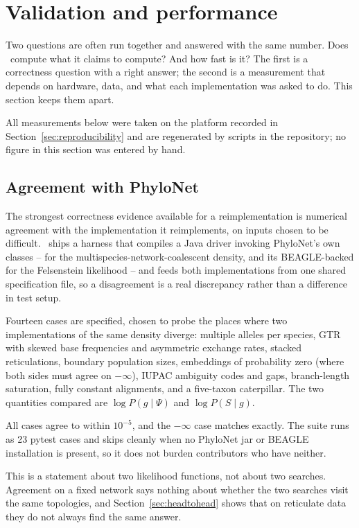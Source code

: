 \section{Validation and performance}
\label{sec:validation}

Two questions are often run together and answered with the same number. Does
\phynetpy\ compute what it claims to compute? And how fast is it? The first is
a correctness question with a right answer; the second is a measurement that
depends on hardware, data, and what each implementation was asked to do. This
section keeps them apart.

All measurements below were taken on the platform recorded in
Section~\ref{sec:reproducibility} and are regenerated by scripts in the
repository; no figure in this section was entered by hand.

\subsection{Agreement with PhyloNet}

The strongest correctness evidence available for a reimplementation is
numerical agreement with the implementation it reimplements, on inputs chosen
to be difficult. \phynetpy\ ships a harness that compiles a Java driver
invoking PhyloNet's own classes --  for
the multispecies-network-coalescent density, and its BEAGLE-backed
\cite{Ayres2012BEAGLE}  for the Felsenstein likelihood --
and feeds both implementations from one shared specification file, so a
disagreement is a real discrepancy rather than a difference in test setup.

Fourteen cases are specified, chosen to probe the places where two
implementations of the same density diverge: multiple alleles per species, GTR
with skewed base frequencies and asymmetric exchange rates, stacked
reticulations, boundary population sizes, embeddings of probability zero (where
both sides must agree on $-\infty$), IUPAC ambiguity codes and gaps,
branch-length saturation, fully constant alignments, and a five-taxon
caterpillar. The two quantities compared are
$\log P(g \mid \Psi)$ and $\log P(S \mid g)$.

All cases agree to within $10^{-5}$, and the $-\infty$ case matches exactly. The
suite runs as 23 pytest cases and skips cleanly when no PhyloNet jar or BEAGLE
installation is present, so it does not burden contributors who have neither.

This is a statement about two likelihood functions, not about two searches.
Agreement on a fixed network says nothing about whether the two searches visit
the same topologies, and Section~\ref{sec:headtohead} shows that on reticulate
data they do not always find the same answer.

